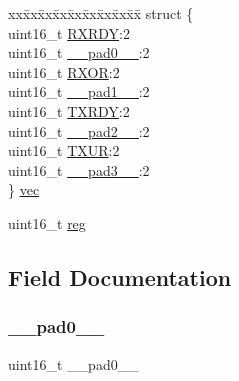 \begin{DoxyCompactItemize}
\begin{tabbing}
\end{tabbing}\item 
\begin{tabbing}
xx\=xx\=xx\=xx\=xx\=xx\=xx\=xx\=xx\=\kill
struct \{\\
\>uint16\_t \mbox{\hyperlink{union_i2_s___i_n_t_e_n_s_e_t___type_afbe93691d575a8711eb9b4cc45469a9c}{RXRDY}}:2\\
\>uint16\_t \mbox{\hyperlink{union_i2_s___i_n_t_e_n_s_e_t___type_a77132c2c26a75f5b8751b235cda23828}{\_\_pad0\_\_}}:2\\
\>uint16\_t \mbox{\hyperlink{union_i2_s___i_n_t_e_n_s_e_t___type_a285bb39da21bfa8a0a512e3922282028}{RXOR}}:2\\
\>uint16\_t \mbox{\hyperlink{union_i2_s___i_n_t_e_n_s_e_t___type_ab72e3a1f2f7db8695c60c658f5a0f11a}{\_\_pad1\_\_}}:2\\
\>uint16\_t \mbox{\hyperlink{union_i2_s___i_n_t_e_n_s_e_t___type_a322dfa8965b7f91311c1c41ed95c05fe}{TXRDY}}:2\\
\>uint16\_t \mbox{\hyperlink{union_i2_s___i_n_t_e_n_s_e_t___type_a82701c5ec65a0fca9a84d8edc46a8192}{\_\_pad2\_\_}}:2\\
\>uint16\_t \mbox{\hyperlink{union_i2_s___i_n_t_e_n_s_e_t___type_abfdd566f2c79878c3cc044d5780c26c8}{TXUR}}:2\\
\>uint16\_t \mbox{\hyperlink{union_i2_s___i_n_t_e_n_s_e_t___type_a1b0a1a9de051f3174325808d959500f7}{\_\_pad3\_\_}}:2\\
\} \mbox{\hyperlink{union_i2_s___i_n_t_e_n_s_e_t___type_a567c961026995740bf026d6d7a9934f7}{vec}}\\

\end{tabbing}\item 
uint16\+\_\+t \mbox{\hyperlink{union_i2_s___i_n_t_e_n_s_e_t___type_a11760f5020019f4aa8cb02e694f7cc44}{reg}}
\end{DoxyCompactItemize}


\subsection{Field Documentation}
\mbox{\label{union_i2_s___i_n_t_e_n_s_e_t___type_a77132c2c26a75f5b8751b235cda23828}} 
\subsubsection{\texorpdfstring{\_\_pad0\_\_}{\_\_pad0\_\_}}
{\footnotesize\ttfamily uint16\+\_\+t \+\_\+\+\_\+pad0\+\_\+\+\_\+}


